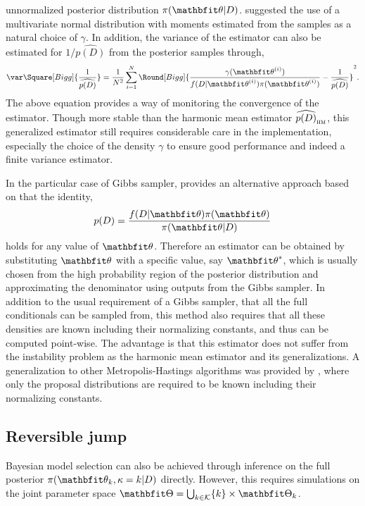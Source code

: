 unnormalized posterior distribution $\pi(\bth|D)$. \textcite{Gelfand:1994ux}
suggested the use of a multivariate normal distribution with moments estimated
from the samples as a natural choice of $\gamma$. In addition, the variance of
the estimator can also be estimated for $1/\widehat{p(D)}$ from the posterior
samples through,
\begin{equation}
  \var\Square[Bigg]{\frac{1}{\widehat{p(D)}}} =
  \frac{1}{N^2}\sum_{i=1}^N \Round[Bigg]{
    \frac{\gamma(\bthiu)}{f(D|\bthiu)\pi(\bthiu)}
    - \frac{1}{\widehat{p(D)}}}^2.
\end{equation}
The above equation provides a way of monitoring the convergence of the
estimator. Though more stable than the harmonic mean estimator
$\widehat{p(D)}_{\text{\textsc{hm}}}$, this generalized estimator still
requires considerable care in the implementation, especially the choice of the
density $\gamma$ to ensure good performance and indeed a finite variance
estimator.

In the particular case of Gibbs sampler, \textcite{Chib:1995em} provides an
alternative approach based on that the identity,
\begin{equation}
  p(D) = \frac{f(D|\bth)\pi(\bth)}{\pi(\bth|D)}
\end{equation}
holds for any value of $\bth$. Therefore an estimator can be obtained by
substituting $\bth$ with a specific value, say $\bth^*$, which is usually
chosen from the high probability region of the posterior distribution and
approximating the denominator using outputs from the Gibbs sampler. In
addition to the usual requirement of a Gibbs sampler, that all the full
conditionals can be sampled from, this method also requires that all these
densities are known including their normalizing constants, and thus can be
computed point-wise. The advantage is that this estimator does not suffer from
the instability problem as the harmonic mean estimator and its
generalizations. A generalization to other Metropolis-Hastings algorithms was
provided by \textcite{Chib:2001gq}, where only the proposal distributions are
required to be known including their normalizing constants.

\subsection{Reversible jump \protect\mcmc}
\label{sub:Reversible jump mcmc}

Bayesian model selection can also be achieved through inference on the full
posterior $\pi(\bth_k,\kappa=k|D)$ directly. However, this requires
simulations on the joint parameter space $\bTh = \bigcup_{k\in\calK} \{k\}
\times \bTh_k$.

